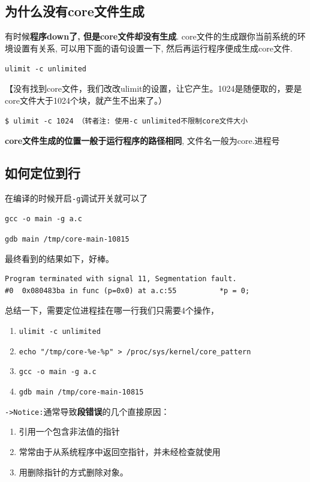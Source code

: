 \documentclass[UTF8,a4paper,8pt]{ctexbook}
\begin{document}
		\subsection{为什么没有core文件生成}
		有时候\textbf{程序down了, 但是core文件却没有生成}. core文件的生成跟你当前系统的环境设置有关系, 可以用下面的语句设置一下, 然后再运行程序便成生成core文件.
		
		\verb|ulimit -c unlimited|
		
		【没有找到core文件，我们改改ulimit的设置，让它产生。1024是随便取的，要是core文件大于1024个块，就产生不出来了。）
		
		\verb|$ ulimit -c 1024 （转者注: 使用-c unlimited不限制core文件大小|
		
		\textbf{core文件生成的位置一般于运行程序的路径相同}, 文件名一般为core.进程号
	
		\subsection{如何定位到行}
		 在编译的时候开启\verb|-g|调试开关就可以了
		 
		 \verb|gcc -o main -g a.c|
		 
		 \verb|gdb main /tmp/core-main-10815 |
		 
		 最终看到的结果如下，好棒。
		 \begin{lstlisting}
Program terminated with signal 11, Segmentation fault.
#0  0x080483ba in func (p=0x0) at a.c:55          *p = 0;
		 \end{lstlisting}
		 
		 总结一下，需要定位进程挂在哪一行我们只需要4个操作，
		 \begin{enumerate}[itemindent = 2em]
		 	\item \verb|ulimit -c unlimited|
		 	\item \verb|echo "/tmp/core-%e-%p" > /proc/sys/kernel/core_pattern|
		 	\item \verb|gcc -o main -g a.c|
		 	\item \verb|gdb main /tmp/core-main-10815| 
		 \end{enumerate}
		 
		\verb|->Notice:|通常导致\textbf{段错误}的几个直接原因：
		\begin{enumerate}[itemindent = 2em]
			\item 引用一个包含非法值的指针
			\item 常常由于从系统程序中返回空指针，并未经检查就使用
			\item 用删除指针的方式删除对象。
		\end{enumerate}
		
\end{document}
